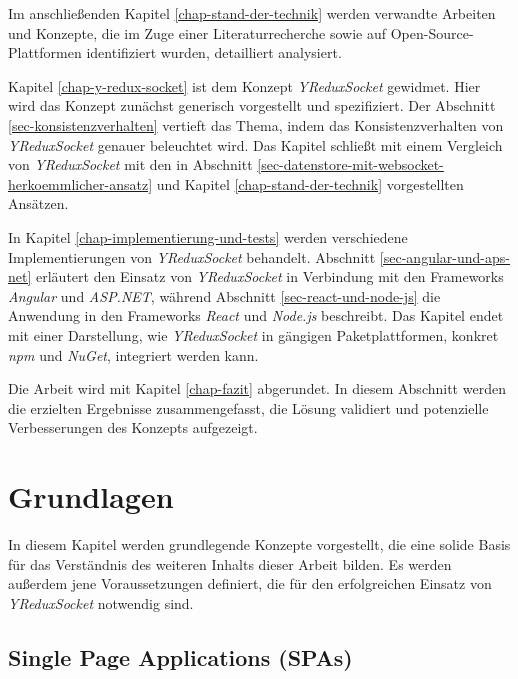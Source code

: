 \documentclass[12pt]{book}          %
\begin{document}
Im anschließenden Kapitel \ref{chap-stand-der-technik} werden verwandte Arbeiten und Konzepte, die im Zuge einer Literaturrecherche sowie auf Open-Source-Plattformen identifiziert wurden, detailliert analysiert.

Kapitel \ref{chap-y-redux-socket} ist dem Konzept \textit{YReduxSocket} gewidmet. Hier wird das Konzept zunächst generisch vorgestellt und spezifiziert. Der Abschnitt \ref{sec-konsistenzverhalten} vertieft das Thema, indem das Konsistenzverhalten von \textit{YReduxSocket} genauer beleuchtet wird. Das Kapitel schließt mit einem Vergleich von \textit{YReduxSocket} mit den in Abschnitt \ref{sec-datenstore-mit-websocket-herkoemmlicher-ansatz} und Kapitel \ref{chap-stand-der-technik} vorgestellten Ansätzen.

In Kapitel \ref{chap-implementierung-und-tests} werden verschiedene Implementierungen von \textit{YReduxSocket} behandelt. Abschnitt \ref{sec-angular-und-aps-net} erläutert den Einsatz von \textit{YReduxSocket} in Verbindung mit den Frameworks \textit{Angular} und \textit{ASP.NET}, während Abschnitt \ref{sec-react-und-node-js} die Anwendung in den Frameworks \textit{React} und \textit{Node.js} beschreibt. Das Kapitel endet mit einer Darstellung, wie \textit{YReduxSocket} in gängigen Paketplattformen, konkret \textit{npm} und \textit{NuGet}, integriert werden kann.

Die Arbeit wird mit Kapitel \ref{chap-fazit} abgerundet. In diesem Abschnitt werden die erzielten Ergebnisse zusammengefasst, die Lösung validiert und potenzielle Verbesserungen des Konzepts aufgezeigt. 



\chapter{Grundlagen}
\label{chap-grundlagen}

In diesem Kapitel werden grundlegende Konzepte vorgestellt, die eine solide Basis für das Verständnis des weiteren Inhalts dieser Arbeit bilden. Es werden außerdem jene Voraussetzungen definiert, die für den erfolgreichen Einsatz von \textit{YReduxSocket} notwendig sind.

\section{Single Page Applications (SPAs)}
\label{sec-single-page-applications}
\end{document}
